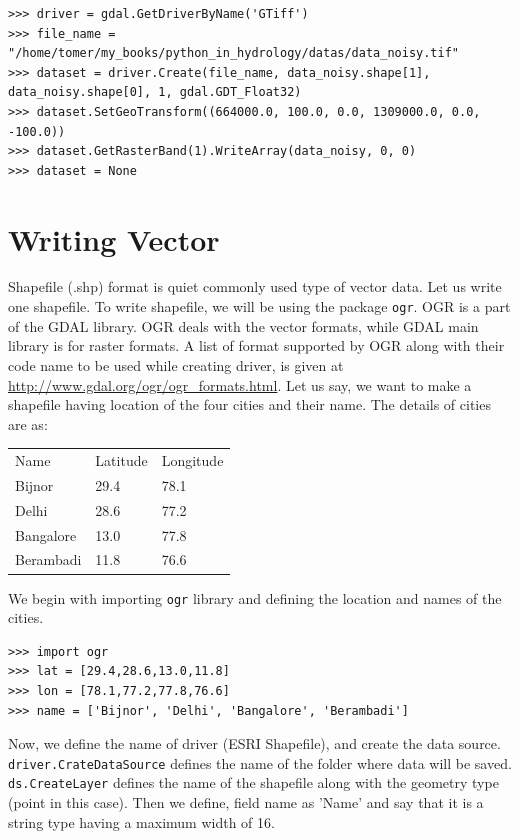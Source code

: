 \documentclass[10pt]{book}
\begin{document}
{\beforeverb \begin{verbatim}
>>> driver = gdal.GetDriverByName('GTiff')
>>> file_name = "/home/tomer/my_books/python_in_hydrology/datas/data_noisy.tif"
>>> dataset = driver.Create(file_name, data_noisy.shape[1], data_noisy.shape[0], 1, gdal.GDT_Float32)
>>> dataset.SetGeoTransform((664000.0, 100.0, 0.0, 1309000.0, 0.0, -100.0))
>>> dataset.GetRasterBand(1).WriteArray(data_noisy, 0, 0)
>>> dataset = None
\end{verbatim} \afterverb


\section{Writing Vector}
Shapefile (.shp) format is quiet commonly used type of vector data. Let us write one shapefile. To write shapefile, we will be using the package \verb"ogr". OGR is a part of the GDAL library. OGR deals with the vector formats, while GDAL main library is for raster formats. A list of format supported by OGR along with their code name to be used while creating driver, is given at \url{http://www.gdal.org/ogr/ogr_formats.html}. Let us say, we want to make a shapefile having location of the four cities  and their name. The details of cities are as:

\begin{tabular}{lll}
Name 		& Latitude 	& Longitude \\
Bijnor		& 29.4 		& 78.1 \\
Delhi		& 28.6		& 77.2 \\
Bangalore	& 13.0		& 77.8 \\
Berambadi	& 11.8		& 76.6 \\
\end{tabular}

We begin with importing \verb"ogr" library and defining the location and names of the cities. 
\beforeverb \begin{verbatim}
>>> import ogr
>>> lat = [29.4,28.6,13.0,11.8]
>>> lon = [78.1,77.2,77.8,76.6]
>>> name = ['Bijnor', 'Delhi', 'Bangalore', 'Berambadi']
\end{verbatim} \afterverb

Now, we define the name of driver (ESRI Shapefile), and create the data source. \verb"driver.CrateDataSource" defines the name of the folder where data will be saved. \verb"ds.CreateLayer" defines the name of the shapefile along with the geometry type (point in this case). Then we define, field name as 'Name' and say that it is a string type having a maximum width of 16. 

}
\end{document}
